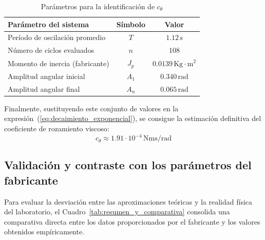 \documentclass[11pt,fleqn]{book} %
\begin{document}
\begin{table}[htbp]
	\centering
	\caption{Parámetros para la identificación de $c_{\theta}$}
	\label{tab:valores_pendulo}
	\begin{tabular}{lcc}
		\hline
		\textbf{Parámetro del sistema} & \textbf{Símbolo} & \textbf{Valor} \\ \hline
		Período de oscilación promedio & $T$ & $1.12\,\text{s}$ \\
		Número de ciclos evaluados & $n$ & $108$ \\
		Momento de inercia (fabricante) & $J_p$ & $0.0139\,\text{Kg}\cdot\text{m}^2$ \\
		Amplitud angular inicial & $A_1$ & $0.340\,\text{rad}$ \\
		Amplitud angular final & $A_n$ & $0.065\,\text{rad}$ \\ \hline
	\end{tabular}
\end{table}

Finalmente, sustituyendo este conjunto de valores en la expresión~(\ref{eq:decaimiento_exponencial}), se consigue la estimación definitiva del coeficiente de rozamiento viscoso:
\begin{equation}
	\boxed{c_{\theta} \approx 1.91 \cdot 10^{-4}\,\text{Nms/rad}}
\end{equation}

\newpage

\subsection{Validación y contraste con los parámetros del fabricante}

Para evaluar la desviación entre las aproximaciones teóricas y la realidad física del laboratorio, el Cuadro~\ref{tab:resumen_y_comparativa} consolida una comparativa directa entre los datos proporcionados por el fabricante y los valores obtenidos empíricamente.
\end{document}
